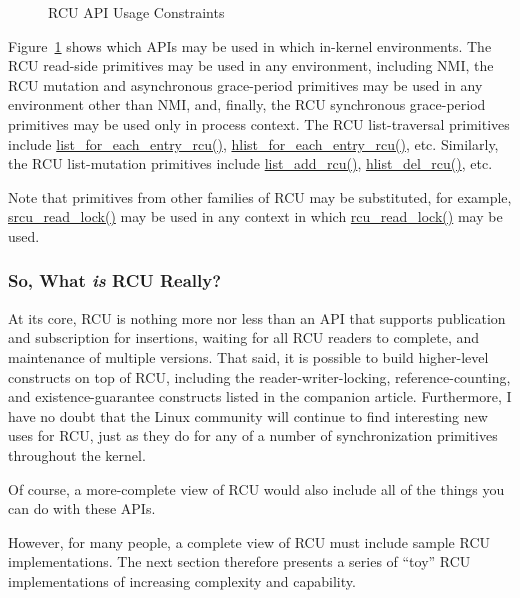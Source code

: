 \begin{figure}[tb]
\begin{center}
\end{center}
\caption{RCU API Usage Constraints}
\label{fig:defer:RCU API Usage Constraints}
\end{figure}

Figure~\ref{fig:defer:RCU API Usage Constraints}
shows which APIs may be used in which in-kernel environments.
The RCU read-side primitives may be used in any environment, including NMI,
the RCU mutation and asynchronous grace-period primitives may be used in any
environment other than NMI, and, finally, the RCU synchronous grace-period
primitives may be used only in process context.
The RCU list-traversal primitives include \url{list_for_each_entry_rcu()},
\url{hlist_for_each_entry_rcu()}, etc.
Similarly, the RCU list-mutation primitives include
\url{list_add_rcu()}, \url{hlist_del_rcu()}, etc.

Note that primitives from other families of RCU may be substituted,
for example, \url{srcu_read_lock()} may be used in any context
in which \url{rcu_read_lock()} may be used.

\subsubsection{So, What \emph{is} RCU Really?}
\label{sec:defer:So, What is RCU Really?}

At its core, RCU is nothing more nor less than an API that supports
publication and subscription for insertions, waiting for all RCU readers
to complete, and maintenance of multiple versions.
That said, it is possible to build higher-level constructs
on top of RCU, including the reader-writer-locking, reference-counting,
and existence-guarantee constructs listed in the companion article.
Furthermore, I have no doubt that the Linux community will continue to
find interesting new uses for RCU,
just as they do for any of a number of synchronization
primitives throughout the kernel.

Of course, a more-complete view of RCU would also include
all of the things you can do with these APIs.

However, for many people, a complete view of RCU must include sample
RCU implementations.
The next section therefore presents a series of ``toy'' RCU implementations
of increasing complexity and capability.
